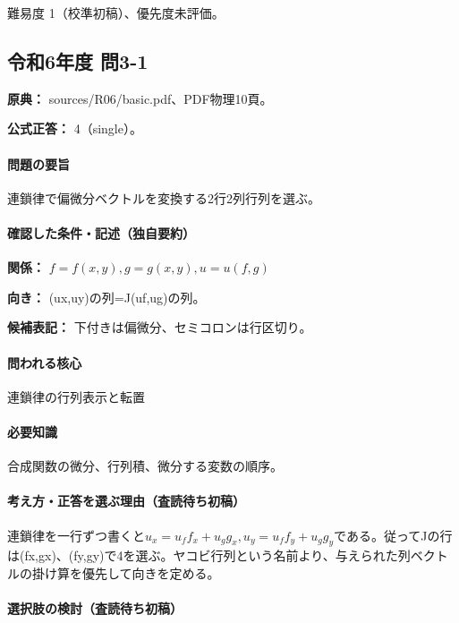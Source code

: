 \par 難易度 1（校準初稿）、優先度未評価。

\subsection{令和6年度 問3-1}
\label{q:r06-reg-basic-3-1}

\noindent\textbf{原典：} sources/R06/basic.pdf、PDF物理10頁。

\textbf{公式正答：} 4（single）。

\paragraph{問題の要旨} 連鎖律で偏微分ベクトルを変換する2行2列行列を選ぶ。

\paragraph{確認した条件・記述（独自要約）}\mbox{}\par

\noindent\textbf{関係：} \(f=f(x,y),g=g(x,y),u=u(f,g)\)\par

\noindent\textbf{向き：} (ux,uy)の列=J(uf,ug)の列。\par

\noindent\textbf{候補表記：} 下付きは偏微分、セミコロンは行区切り。\par

\paragraph{問われる核心} 連鎖律の行列表示と転置

\paragraph{必要知識} 合成関数の微分、行列積、微分する変数の順序。

\paragraph{考え方・正答を選ぶ理由（査読待ち初稿）} 連鎖律を一行ずつ書くと\(u_x=u_ff_x+u_gg_x,u_y=u_ff_y+u_gg_y\)である。従ってJの行は(fx,gx)、(fy,gy)で4を選ぶ。ヤコビ行列という名前より、与えられた列ベクトルの掛け算を優先して向きを定める。

\paragraph{選択肢の検討（査読待ち初稿）}\mbox{}\par

